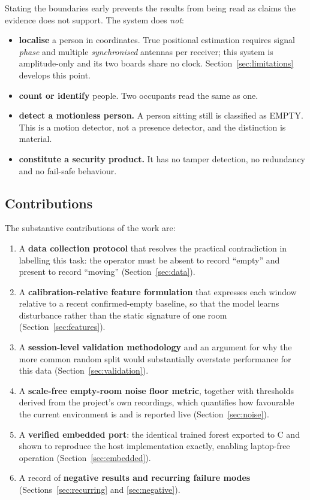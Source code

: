 \documentclass[11pt,a4paper]{article}
\begin{document}
Stating the boundaries early prevents the results from being read as claims the
evidence does not support. The system does \emph{not}:

\begin{itemize}[leftmargin=1.4em, itemsep=2pt]
  \item \textbf{localise} a person in coordinates. True positional estimation
        requires signal \emph{phase} and multiple \emph{synchronised} antennas
        per receiver; this system is amplitude-only and its two boards share no
        clock. Section~\ref{sec:limitations} develops this point.
  \item \textbf{count or identify} people. Two occupants read the same as one.
  \item \textbf{detect a motionless person.} A person sitting still is
        classified as EMPTY. This is a motion detector, not a presence
        detector, and the distinction is material.
  \item \textbf{constitute a security product.} It has no tamper detection, no
        redundancy and no fail-safe behaviour.
\end{itemize}

\subsection{Contributions}

The substantive contributions of the work are:

\begin{enumerate}[leftmargin=1.6em, itemsep=3pt]
  \item A \textbf{data collection protocol} that resolves the practical
        contradiction in labelling this task: the operator must be absent to
        record ``empty'' and present to record ``moving''
        (Section~\ref{sec:data}).
  \item A \textbf{calibration-relative feature formulation} that expresses each
        window relative to a recent confirmed-empty baseline, so that the model
        learns disturbance rather than the static signature of one room
        (Section~\ref{sec:features}).
  \item A \textbf{session-level validation methodology} and an argument for why
        the more common random split would substantially overstate performance
        for this data (Section~\ref{sec:validation}).
  \item A \textbf{scale-free empty-room noise floor metric}, together with
        thresholds derived from the project's own recordings, which quantifies
        how favourable the current environment is and is reported live
        (Section~\ref{sec:noise}).
  \item A \textbf{verified embedded port}: the identical trained forest exported
        to C and shown to reproduce the host implementation exactly, enabling
        laptop-free operation (Section~\ref{sec:embedded}).
  \item A record of \textbf{negative results and recurring failure modes}
        (Sections~\ref{sec:recurring} and \ref{sec:negative}).
\end{enumerate}
\end{document}
